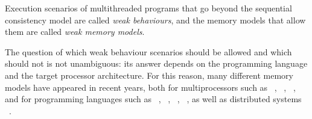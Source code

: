 Execution scenarios of multithreaded programs that go beyond the sequential consistency model are called \emph{weak behaviours}, and the memory models that allow them are called \emph{weak memory models}.

The question of which weak behaviour scenarios should be allowed and which should not is not unambiguous: its answer depends on the programming language and the target processor architecture.
For this reason, many different memory models have appeared in recent years, both for multiprocessors such as \Intel~\autocite{Sewell-al:CACM10},
\ARM~\autocite{Pulte-al:POPL18},
\POWER~\autocite{Sarkar-al:PLDI11}, and for programming languages such as
\CPP~\autocite{Batty-al:POPL11},
\Java~\autocite{Manson-al:POPL05},
\JS~\autocite{Watt-al:PLDI2020},
\OCaml~\autocite{Dolan-al:PLDI18},
as well as distributed systems
~\autocite{Jagadeesan-al:ESOP2018,Lahav-Boker:PLDI2020}.

